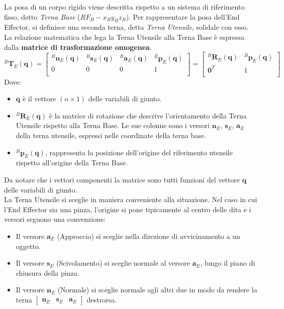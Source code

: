 \documentclass[11pt, a4paper]{report}
\begin{document}
La posa di un corpo rigido viene descritta rispetto a un sistema di riferimento fisso, detto \textit{Terna Base} ($RF_{B} - x_{B}y_{B}z_{B}$). Per rappresentare la posa dell'End Effector, si definisce una seconda terna, detta \textit{Terna Utensile}, solidale con esso. La relazione matematica che lega la Terna Utensile alla Terna Base è espressa dalla \textbf{matrice di trasformazione omogenea}.
\[
    ^{B}\mathbf{T}_{E}(\mathbf{q}) =
    \begin{bmatrix}
        ^{B}\mathbf{n}_{E}(\mathbf{q}) & ^{B}\mathbf{s}_{E}(\mathbf{q}) & ^{B}\mathbf{a}_{E}(\mathbf{q}) & ^{B}\mathbf{p}_{E}(\mathbf{q})\\
        0 & 0 & 0 & 1\\
    \end{bmatrix}
    =
    \begin{bmatrix}
        ^{B}\mathbf{R}_{E}(\mathbf{q}) & ^{B}\mathbf{p}_{E}(\mathbf{q})\\
        \mathbf{0}^{T} & 1\\
    \end{bmatrix}
\]
Dove:
\begin{itemize}
    \item $\mathbf{q}$ è il vettore $(n \times 1)$ delle variabili di giunto.
    \item $^{B}\mathbf{R}_{E}(\mathbf{q})$ è la matrice di rotazione che descrive l'orientamento della Terna Utensile rispetto alla Terna Base. Le sue colonne sono i versori $\mathbf{n}_{E}$, $\mathbf{s}_{E}$, $\mathbf{a}_{E}$ della terna utensile, espressi nelle coordinate della terna base.
    \item $^{B}\mathbf{p}_{E}(\mathbf{q})$, rappresenta la posizione dell'origine del riferimento utensile rispetto all'origine della Terna Base.
\end{itemize}
Da notare che i vettori componenti la matrice sono tutti funzioni del vettore $\mathbf{q}$ delle variabili di giunto.\\
La Terna Utensile si sceglie in maniera conveniente alla situazione. Nel caso in cui l'End Effector sia una pinza, l'origine si pone tipicamente al centro delle dita e i versori seguono una convenzione:
\begin{itemize}
    \item Il versore $\mathbf{a}_{E}$ (Approccio) si sceglie nella direzione di avvicinamento a un oggetto.
    \item Il versore $\mathbf{s}_{E}$ (Scivolamento) si sceglie normale al versore $\mathbf{a}_{E}$, lungo il piano di chiusura della pinza.
    \item Il versore $\mathbf{n}_{E}$ (Normale) si sceglie normale agli altri due in modo da rendere la terna \( \begin{bmatrix} \mathbf{n}_{E} & \mathbf{s}_{E} & \mathbf{a}_{E} \end{bmatrix} \) destrorsa.
\end{itemize}
\end{document}
